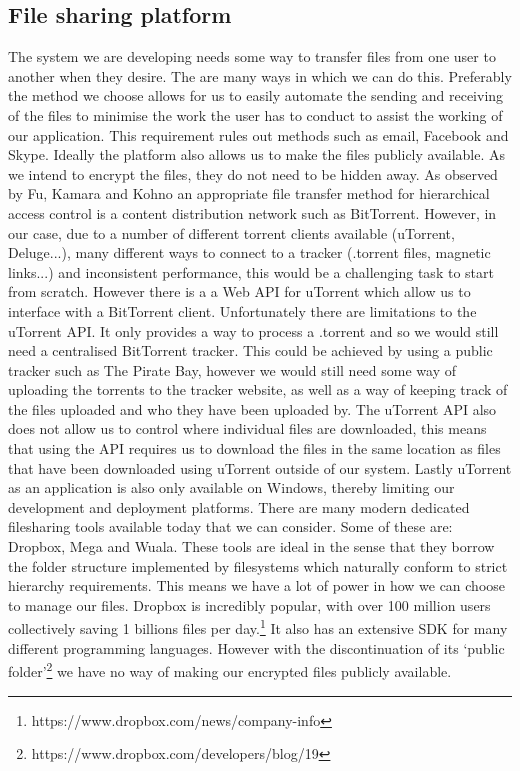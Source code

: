 \documentclass[12pt, titlepage]{article}
\begin{document}
\subsection{File sharing platform}
The system we are developing needs some way to transfer files from one user to another when they desire. The are many ways in which we can do this. Preferably the method we choose allows for us to easily automate the sending and receiving of the files to minimise the work the user has to conduct to assist the working of our application. This requirement rules out methods such as email, Facebook and Skype. Ideally the platform also allows us to make the files publicly available. As we intend to encrypt the files, they do not need to be hidden away.
\newline \indent As observed by Fu, Kamara and Kohno an appropriate file transfer method for hierarchical access control is a content distribution network such as BitTorrent.\cite{bittorrent} However, in our case, due to a number of different torrent clients available (uTorrent, Deluge...), many different ways to connect to a tracker (.torrent files, magnetic links...) and inconsistent performance, this would be a challenging task to start from scratch. However there is a a Web API for uTorrent which allow us to interface with a BitTorrent client.\cite{http://www.utorrent.com/community/developers/webapi} Unfortunately there are limitations to the uTorrent API. It only provides a way to process a .torrent and so we would still need a centralised BitTorrent tracker. This could be achieved by using a public tracker such as The Pirate Bay, however we would still need some way of uploading the torrents to the tracker website, as well as a way of keeping track of the files uploaded and who they have been uploaded by. The uTorrent API also does not allow  us to control where individual files are downloaded, this means that using the API requires us to download the files in the same location as files that have been downloaded using uTorrent outside of our system. Lastly uTorrent as an application is also only available on Windows, thereby limiting our development and deployment platforms.
\newline \indent There are many modern dedicated filesharing tools available today that we can consider. Some of these are: Dropbox, Mega and Wuala. These tools are ideal in the sense that they borrow the folder structure implemented by filesystems which naturally conform to strict hierarchy requirements. This means we have a lot of power in how we can choose to manage our files. Dropbox is incredibly popular, with over 100 million users collectively saving 1 billions files per day.\footnote{https://www.dropbox.com/news/company-info} It also has an extensive SDK for many different programming languages. However with the discontinuation of its `public folder'\footnote{https://www.dropbox.com/developers/blog/19} we have no way of making our encrypted files publicly available.
\end{document}
